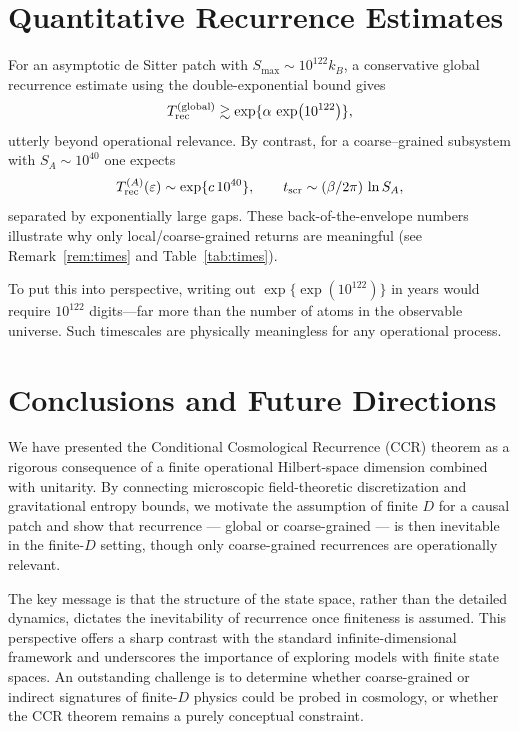 \documentclass[12pt]{article}
\newcommand{\Smax}{S_{\max}}
\theoremstyle{remark}
\begin{document}
\section{Quantitative Recurrence Estimates}
For an asymptotic de Sitter patch with $\Smax\sim 10^{122} k_B$, a conservative global recurrence estimate using the double-exponential bound gives
\[
 T^{\rm (global)}_{\text{rec}} \gtrsim \exp\{\alpha\,\exp(10^{122})\},
\]
utterly beyond operational relevance. By contrast, for a coarse--grained subsystem with $S_A\sim 10^{40}$ one expects
\[
 T^{(A)}_{\rm rec}(\varepsilon) \sim \exp\{c\,10^{40}\},\qquad t_{\rm scr} \sim (\beta/2\pi)\,\ln S_A,
\]
separated by exponentially large gaps. These back-of-the-envelope numbers illustrate why only local/coarse-grained returns are meaningful (see Remark~\ref{rem:times} and Table~\ref{tab:times}).

To put this into perspective, writing out $\exp\{\exp(10^{122})\}$ in years would require $10^{122}$ digits---far more than 
the number of atoms in the observable universe. Such timescales are physically meaningless for any operational process.


\section{Conclusions and Future Directions}

We have presented the Conditional Cosmological Recurrence (CCR) theorem as a rigorous
consequence of a finite operational Hilbert-space dimension combined with unitarity. By
connecting microscopic field-theoretic discretization and gravitational entropy bounds, we
motivate the assumption of finite $D$ for a causal patch and show that recurrence --- global
or coarse-grained --- is then inevitable in the finite-$D$ setting, though only coarse-grained
recurrences are operationally relevant.

The key message is that the structure of the state space, rather than the detailed dynamics,
dictates the inevitability of recurrence once finiteness is assumed. This perspective offers a
sharp contrast with the standard infinite-dimensional framework and underscores the importance
of exploring models with finite state spaces. An outstanding challenge is to determine whether
coarse-grained or indirect signatures of finite-$D$ physics could be probed in cosmology, or
whether the CCR theorem remains a purely conceptual constraint.

\vspace{0.3cm}
\end{document}
